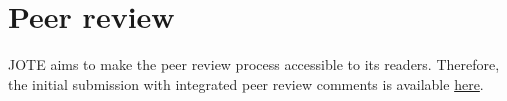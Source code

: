 \documentclass[serif, twocolumn, authordate, meta]{jote-article}
\begin{document}
{}
\section*{Peer review} 

JOTE aims to make the peer review process accessible to its readers. Therefore, the initial submission with integrated peer review comments is available \href{https://doi.org/10.36850/m1.pr1}{here}.

\setlength{\bibhang}{\parindent}
\nocite{*} 
 {}
\printbibliography
\end{document}
